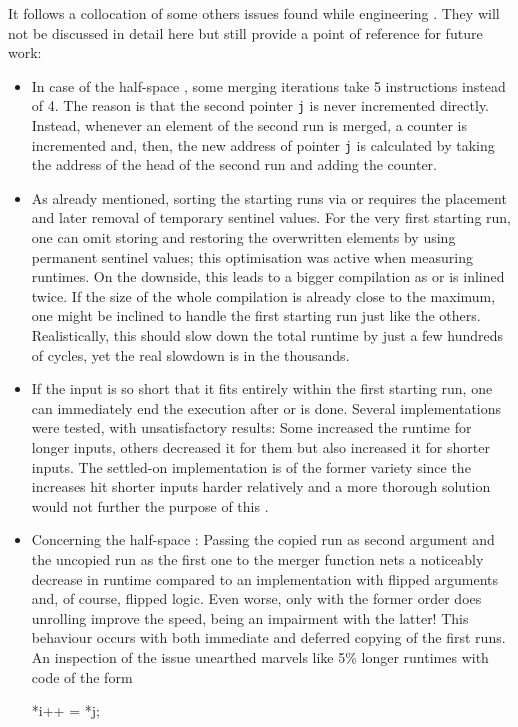 It follows a collocation of some others issues found while engineering \MS{}.
They will not be discussed in detail here but still provide a point of reference for future work:
\begin{itemize}
	\item
	In case of the half-space \MS{}, some merging iterations take 5 instructions instead of 4.
	The reason is that the second pointer \lstinline|j| is never incremented directly.
	Instead, whenever an element of the second run is merged, a counter is incremented and, then, the new address of pointer \lstinline|j| is calculated by taking the address of the head of the second run and adding the counter.

	\item
	As already mentioned, sorting the starting runs via \IS{} or \ShS{} requires the placement and later removal of temporary sentinel values.
	For the very first starting run, one can omit storing and restoring the overwritten elements by using permanent sentinel values;
	this optimisation was active when measuring runtimes.
	On the downside, this leads to a bigger compilation as \IS{} or \ShS{} is inlined twice.
	If the size of the whole compilation is already close to the maximum, one might be inclined to handle the first starting run just like the others.
	Realistically, this should slow down the total runtime by just a few hundreds of cycles, yet the real slowdown is in the thousands.

	\item
	If the input is so short that it fits entirely within the first starting run, one can immediately end the execution after \IS{} or \ShS{} is done.
	Several implementations were tested, with unsatisfactory results:
	Some increased the runtime for longer inputs, others decreased it for them but also increased it for shorter inputs.
	The settled-on implementation is of the former variety since the increases hit shorter inputs harder relatively and a more thorough solution would not further the purpose of this .

	\item
	Concerning the half-space \MS{}:
	Passing the copied run as second argument and the uncopied run as the first one to the merger function nets a noticeably decrease in runtime compared to an implementation with flipped arguments and, of course, flipped logic.
	Even worse, only with the former order does unrolling improve the speed, being an impairment with the latter!
	This behaviour occurs with both immediate and deferred copying of the first runs.
	An inspection of the issue unearthed marvels like 5\% longer runtimes with code of the form
	{  %
		\par
		\centering
		\begin{minipage}{10cm}
			\centering
			\begin{minipage}{ \widthof{\ttfamily a = b - i;} }
				\ttfamily
				*i++ = *j;


\end{minipage}
\end{minipage}}
\end{itemize}
